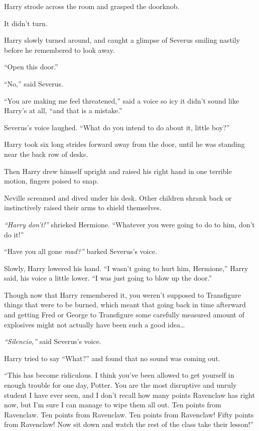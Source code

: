 Harry strode across the room and grasped the doorknob.

It didn't turn.

Harry slowly turned around, and caught a glimpse of Severus smiling
nastily before he remembered to look away.

``Open this door.''

``No,'' said Severus.

``You are making me feel threatened,'' said a voice so icy it didn't
sound like Harry's at all, ``and that is a mistake.''

Severus's voice laughed. ``What do you intend to do about it, little
boy?''

Harry took six long strides forward away from the door, until he was
standing near the back row of desks.

Then Harry drew himself upright and raised his right hand in one
terrible motion, fingers poised to snap.

Neville screamed and dived under his desk. Other children shrank back or
instinctively raised their arms to shield themselves.

\emph{``Harry don't!''} shrieked Hermione. ``Whatever you were going to
do to him, don't do it!''

``Have you all gone \emph{mad?''} barked Severus's voice.

Slowly, Harry lowered his hand. ``I wasn't going to hurt him,
Hermione,'' Harry said, his voice a little lower. ``I was just going to
blow up the door.''

Though now that Harry remembered it, you weren't supposed to Transfigure
things that were to be burned, which meant that going back in time
afterward and getting Fred or George to Transfigure some carefully
measured amount of explosives might not actually have been such a good
idea\ldots{}

\emph{``Silencio,''} said Severus's voice.

Harry tried to say ``What?'' and found that no sound was coming out.

``This has become ridiculous. I think you've been allowed to get
yourself in enough trouble for one day, Potter. You are the most
disruptive and unruly student I have ever seen, and I don't recall how
many points Ravenclaw has right now, but I'm sure I can manage to wipe
them all out. Ten points from Ravenclaw. Ten points from Ravenclaw. Ten
points from Ravenclaw! Fifty points from Ravenclaw! Now sit down and
watch the rest of the class take their lesson!''

